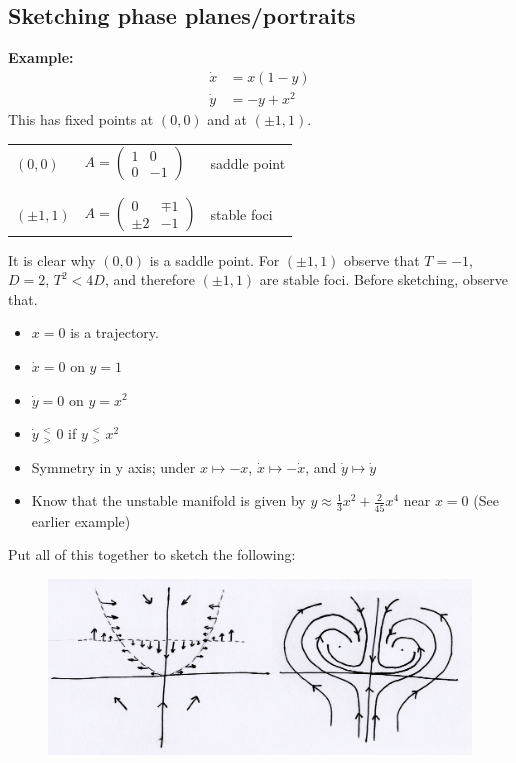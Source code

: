 \documentclass{article}
\begin{document}
\subsection{Sketching phase planes/portraits}
%
\textbf{Example:}
\\
\begin{align*}
\dot{x} &= x(1-y) \\
\dot{y} &= -y + x^2
\end{align*}
This has fixed points at $(0,0)$ and at $(\pm1,1)$. 
\begin{center}
\begin{tabular}{ m{2cm} m{3cm} m{3cm} }
$(0,0)$ & $A = \left( \begin{array}{cr} 1 & 0 \\ 0 & -1 \end{array} \right)$ & saddle point \\ \\ \\
$(\pm 1,1)$ & $A = \left( \begin{array}{cr} 0 & \mp 1 \\ \pm 2 & -1 \end{array} \right)$ & stable foci
\end{tabular}
\end{center}
It is clear why $(0,0)$ is a saddle point. For $(\pm1,1)$ observe that 
$T=-1$, $D=2$, $T^2 < 4D$, and therefore $(\pm 1, 1)$ are stable foci. Before
sketching, observe that.
\begin{itemize}
\item $x = 0$ is a trajectory.
\item $\dot{x}=0$ on $y=1$
\item $\dot{y} = 0$ on $y=x^2$
\item $\dot{y} \,\, ^{<}_{>} \,\, 0$ if $y \,\,^{<}_{>} \,\, x^2$
\item Symmetry in y axis; under $x \mapsto -x$, $\dot{x} \mapsto -\dot{x}$, and $\dot{y} \mapsto \dot{y}$
\item Know that the unstable manifold is given by $y \approx \frac{1}{3} x^2 + \frac{2}{45} x^4$
near $x=0$ (See earlier example)
\end{itemize}
Put all of this together to sketch the following:
\begin{figure}[H]
\centering
\includegraphics[scale=0.2]{fig20.png}
\end{figure}
\end{document}
